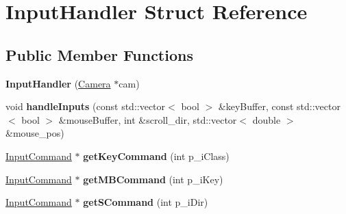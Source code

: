 \hypertarget{struct_input_handler}{}\section{Input\+Handler Struct Reference}
\label{struct_input_handler}
\subsection*{Public Member Functions}
\begin{DoxyCompactItemize}
\item 
\mbox{\label{struct_input_handler_a03e7a64210b8cad91004d1f68952ce68}} 
{\bfseries Input\+Handler} (\mbox{\hyperlink{class_camera}{Camera}} $\ast$cam)
\item 
\mbox{\label{struct_input_handler_a179c2384c7b5d775c15f90cf425c2dc9}} 
void {\bfseries handle\+Inputs} (const std\+::vector$<$ bool $>$ \&key\+Buffer, const std\+::vector$<$ bool $>$ \&mouse\+Buffer, int \&scroll\+\_\+dir, std\+::vector$<$ double $>$ \&mouse\+\_\+pos)
\item 
\mbox{\label{struct_input_handler_aac82086643b9c0be8a7daf67bc192694}} 
\mbox{\hyperlink{class_input_command}{Input\+Command}} $\ast$ {\bfseries get\+Key\+Command} (int p\+\_\+i\+Class)
\item 
\mbox{\label{struct_input_handler_abadd95007d2c558b651647628e0200ea}} 
\mbox{\hyperlink{class_input_command}{Input\+Command}} $\ast$ {\bfseries get\+M\+B\+Command} (int p\+\_\+i\+Key)
\item 
\mbox{\label{struct_input_handler_a19a89ec58296f3453488c310b80e031f}} 
\mbox{\hyperlink{class_input_command}{Input\+Command}} $\ast$ {\bfseries get\+S\+Command} (int p\+\_\+i\+Dir)
\end{DoxyCompactItemize}
